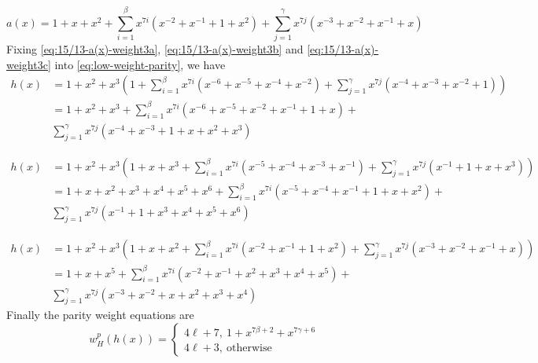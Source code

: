 \documentclass[11pt, oneside, dvipdfmx]{book}
\begin{document}
\begin{example}[15/13 RSC code, $f(x)=1+x^2+x^3,~g(x)=1+x+x^3$]
\begin{equation}
a(x)=1+x+x^2+\sum_{i=1}^{\beta}x^{7i}\left(x^{-2}+x^{-1}+1+x^{2}\right) + \sum_{j=1}^{\gamma}x^{7j}\left(x^{-3}+x^{-2}+x^{-1}+x\right)
\label{eq:15/13-a(x)-weight3c}
\end{equation}
Fixing \eqref{eq:15/13-a(x)-weight3a}, \eqref{eq:15/13-a(x)-weight3b} and  \eqref{eq:15/13-a(x)-weight3c}  into \eqref{eq:low-weight-parity}, we have 
\begin{equation}
\begin{split}
h(x)&=1+x^2+x^3\left(1+\sum_{i=1}^{\beta}x^{7i}\left(x^{-6}+x^{-5}+x^{-4}+x^{-2}\right) + \sum_{j=1}^{\gamma}x^{7j}\left(x^{-4}+x^{-3}+x^{-2}+1\right)\right)\\
&=1+x^2+x^3+\sum_{i=1}^{\beta}x^{7i}\left(x^{-6}+x^{-5}+x^{-2}+x^{-1}+1+x\right) +\\ &\sum_{j=1}^{\gamma}x^{7j}\left(x^{-4}+x^{-3}+1+x+x^2+x^3\right)
\end{split}
\label{eq:5/7-h(x)-weight-3a}
\end{equation}

\begin{equation}
\begin{split}
h(x)&=1+x^2+x^3\left(1+x+x^3+\sum_{i=1}^{\beta}x^{7i}\left(x^{-5}+x^{-4}+x^{-3}+x^{-1}\right) + \sum_{j=1}^{\gamma}x^{7j}\left(x^{-1}+1+x+x^{3}\right)\right)\\
&=1+x+x^2+x^3+x^4+x^5+x^6+\sum_{i=1}^{\beta}x^{7i}\left(x^{-5}+x^{-4}+x^{-1}+1+x+x^2\right) +\\ &\sum_{j=1}^{\gamma}x^{7j}\left(x^{-1}+1+x^3+x^4+x^5+x^6\right)
\end{split}
\label{eq:5/7-h(x)-weight-3b}
\end{equation}

\begin{equation}
\begin{split}
h(x)&=1+x^2+x^3\left(1+x+x^2+\sum_{i=1}^{\beta}x^{7i}\left(x^{-2}+x^{-1}+1+x^{2}\right) + \sum_{j=1}^{\gamma}x^{7j}\left(x^{-3}+x^{-2}+x^{-1}+x\right)\right)\\
&=1+x+x^5+\sum_{i=1}^{\beta}x^{7i}\left(x^{-2}+x^{-1}+x^{2}+x^3+x^4+x^5\right) +\\ &\sum_{j=1}^{\gamma}x^{7j}\left(x^{-3}+x^{-2}+x+x^2+x^3+x^4\right)
\end{split}
\label{eq:5/7-h(x)-weight-3c}
\end{equation}
Finally the parity weight equations are 
$$
w_H^p(h(x))=
\begin{cases}
4\ell+7,~1+x^{7\beta+2}+x^{7\gamma+6}\\
4\ell+3,~\text{otherwise}
\end{cases}
$$


\end{example}
\end{document}
